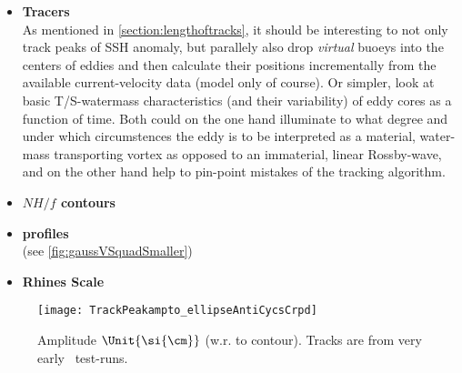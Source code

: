 \begin{itemize}
\item
\textbf{Tracers}\\
As mentioned in \ref{section:lengthoftracks}, it should be interesting to not only track peaks of SSH anomaly, but parallely also \eg drop \textit{virtual}  buoeys into the centers of eddies and then calculate their positions incrementally from the available current-velocity data (model only of course). Or simpler, look at basic T/S-watermass characteristics (and their variability) of eddy cores as a function of time. Both could on the one hand illuminate to what degree and under which circumstences the eddy is to be interpreted as a material, water-mass transporting vortex as opposed to an immaterial, linear Rossby-wave, and on the other hand help to pin-point mistakes of the tracking algorithm.      



\item
\textbf{$N H/f$ contours}\\

\item
\textbf{profiles}\\
(see \cref{fig:gaussVSquadSmaller})
\TODO{}

\item
\textbf{Rhines Scale}\\
\TODO{}

\end{itemize}




\begin{figure*}
\texttt{[image: TrackPeakampto\_ellipseAntiCycsCrpd]}
\caption{Amplitude $\Unit{\si{\cm}}$ (w.r. to contour). Tracks are from very early \POP~test-runs.}
\label{fig:TrackPeakampto_ellipseAntiCycsCrpd}
\end{figure*}
